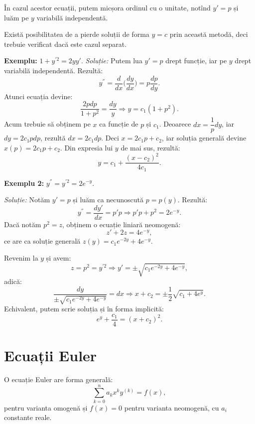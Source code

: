 În cazul acestor ecuații, putem micșora ordinul cu o unitate, notînd
$ y' = p $ și luăm pe $ y $ variabilă independentă.

\begin{remark}\label{rk:aut-const}
  Există posibilitatea de a pierde soluții de forma $ y = c $ prin această
  metodă, deci trebuie verificat dacă este cazul separat.
\end{remark}

\textbf{Exemplu:} $ 1 + y^{'2} = 2yy' $.
\emph{Soluție:} Putem lua $ y' = p $ drept funcție, iar pe $ y $ drept
variabilă independentă. Rezultă:
\[
  y^{''} = \dfrac{d}{dx} \Big( \dfrac{dy}{dx} \Big) = p \dfrac{dp}{dy}.
\]
Atunci ecuația devine:
\[
  \dfrac{2p dp}{1 + p^2} = \dfrac{dy}{y} \Rightarrow %
  y = c_1(1 + p^2).
\]
Acum trebuie să obținem pe $ x $ ca funcție de $ p $ și $ c_1 $.
Deoarece $ dx = \dfrac{1}{p} dy $, iar $ dy = 2c_1 pdp $, rezultă
$ dx = 2c_1 dp $. Deci $ x = 2c_1p + c_2 $, iar soluția generală devine
$ x(p) = 2c_1 p + c_2 $. Din expresia lui $ y $ de mai sus, rezultă:
\[
  y = c_1 + \dfrac{(x - c_2)^2}{4c_1}.
\]

\vspace{1cm}

\textbf{Exemplu 2:} $ y^{''} = y^{'2} = 2e^{-y} $.

\emph{Soluție:} Notăm $ y' = p $ și luăm ca necunoscută $ p = p(y) $.
Rezultă:
\[
  y^{''} = \dfrac{dy'}{dx} = p'p \Rightarrow p'p + p^2 = 2e^{-y}.
\]
Dacă notăm $ p^2 = z $, obținem o ecuație liniară neomogenă:
\[
  z' + 2z = 4e^{-y},
\]
ce are ca soluție generală $ z(y) = c_1 e^{-2y} + 4e^{-y} $.

Revenim la $ y $ și avem:
\[
  z = p^2 = y^{'2} \Rightarrow y' = \pm \sqrt{c_1 e^{-2y} + 4e^{-y}},
\]
adică:
\[
  \dfrac{dy}{\pm \sqrt{c_1 e^{-2y} + 4e^{-y}}} = dx \Rightarrow %
  x + c_2 = \pm \dfrac{1}{2} \sqrt{c_1 + 4e^y}.
\]
Echivalent, putem scrie soluția și în forma implicită:
\[
  e^y + \dfrac{c_1}{4} = (x + c_2)^2.
\]


\section{Ecuații Euler}

O ecuație Euler are forma generală:
\[
  \sum_{k = 0}^n a_k x^k y^{(k)} = f(x),
\]
pentru varianta omogenă și $ f(x) = 0 $ pentru varianta neomogenă, cu $ a_i $
constante reale.

